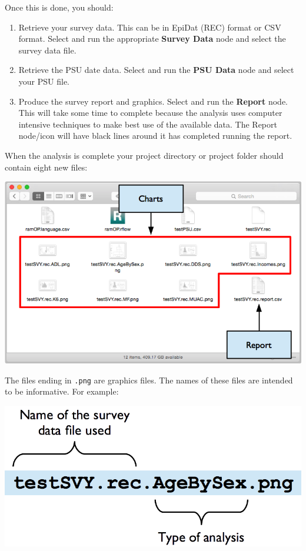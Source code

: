 \documentclass[12pt,a4paper]{book}
\theoremstyle{definition}
\theoremstyle{definition}
\theoremstyle{definition}
\theoremstyle{remark}
\begin{document}
Once this is done, you should:

\begin{enumerate}
\def\labelenumi{\arabic{enumi}.}
\item
  Retrieve your survey data. This can be in EpiDat (REC) format or CSV
  format. Select and run the appropriate \textbf{Survey Data} node and
  select the survey data file.
\item
  Retrieve the PSU date data. Select and run the \textbf{PSU Data} node
  and select your PSU file.
\item
  Produce the survey report and graphics. Select and run the
  \textbf{Report} node. This will take some time to complete because the
  analysis uses computer intensive techniques to make best use of the
  available data. The Report node/icon will have black lines around it
  has completed running the report.
\end{enumerate}

When the analysis is complete your project directory or project folder
should contain eight new files:

\begin{center}\includegraphics{figures/workflowResults01} \end{center}

The files ending in \texttt{.png} are graphics files. The names of these
files are intended to be informative. For example:

\begin{center}\includegraphics{figures/workflowResults02} \end{center}
\end{document}
